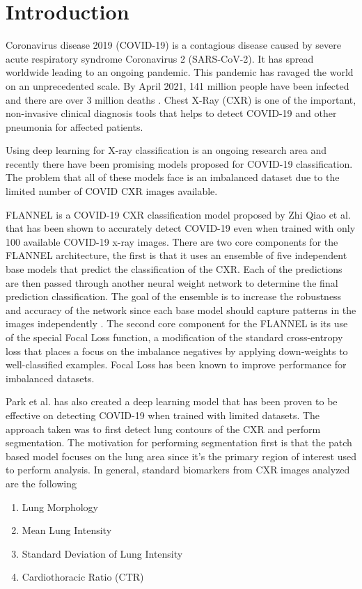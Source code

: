\documentclass{sigkddExp}
\begin{document}
\section{Introduction}
Coronavirus disease 2019 (COVID-19) is a contagious disease caused by severe
acute respiratory syndrome Coronavirus 2 (SARS-CoV-2). It has spread worldwide
leading to an ongoing pandemic. This pandemic has ravaged the world on an
unprecedented scale. By April 2021, 141 million people have been infected and
there are over 3 million deaths \cite{whocovid1920-apr-21}. Chest X-Ray (CXR) is
one of the important, non-invasive clinical diagnosis tools that helps to detect
COVID-19 and other pneumonia for affected patients.

Using deep learning for X-ray classification is an ongoing research area and
recently there have been promising models proposed for COVID-19 classification.
The problem that all of these models face is an imbalanced dataset due to the
limited number of COVID CXR images available.

FLANNEL is a COVID-19 CXR classification model proposed by Zhi Qiao et al.
\cite{10.1093/jamia/ocaa280} that has been shown to accurately detect COVID-19
even when trained with only 100 available COVID-19 x-ray images. There are two
core components for the FLANNEL architecture, the first is that it uses an
ensemble \cite{58871} of five independent base models that predict the
classification of the CXR. Each of the predictions are then passed through
another neural weight network to determine the final prediction classification.
The goal of the ensemble is to increase the robustness and accuracy of the
network since each base model should capture patterns in the images
independently \cite{combine}. The second core component for the FLANNEL is its
use of the special Focal Loss \cite{lin2018focal} function, a modification of
the standard cross-entropy loss that places a focus on the imbalance negatives
by applying down-weights to well-classified examples. Focal Loss has been known
to improve performance for imbalanced datasets.

Park et al. \cite{pmid32396075} has also created a deep learning model that has
been proven to be effective on detecting COVID-19 when trained with limited
datasets. The approach taken was to first detect lung contours of the CXR and
perform segmentation. The motivation for performing segmentation first is that
the patch based model focuses on the lung area since it’s the primary region of
interest used to perform analysis.  In general, standard biomarkers
\cite{pmid32396075} from CXR images analyzed are the following
\begin{enumerate}
    \item Lung Morphology
    \item Mean Lung Intensity
    \item Standard Deviation of Lung Intensity
    \item Cardiothoracic Ratio (CTR)
\end{enumerate}
\end{document}
